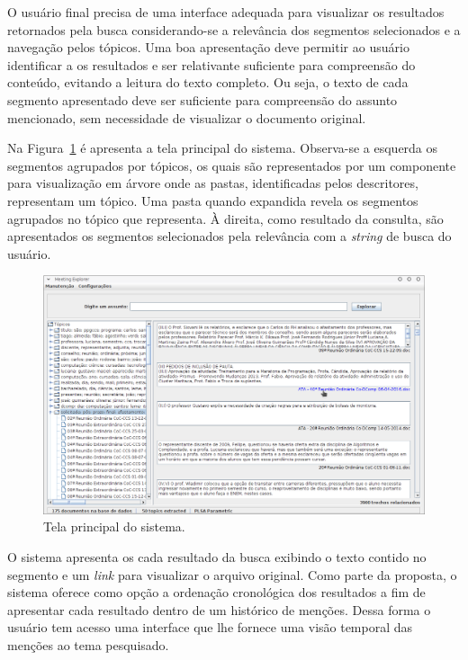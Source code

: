 O usuário final precisa de uma interface adequada para visualizar os resultados retornados pela busca considerando-se a relevância dos segmentos selecionados e a navegação pelos tópicos. Uma boa apresentação deve permitir ao usuário identificar a os resultados e ser relativante suficiente para compreensão do conteúdo, evitando a leitura do texto completo. Ou seja, o texto de cada segmento apresentado deve ser suficiente para compreensão do assunto mencionado, sem necessidade de visualizar o documento original.



Na Figura~\ref{fig:tela-principal} é apresenta a tela principal do sistema. Observa-se a esquerda os segmentos agrupados por tópicos, os quais são representados por um componente para visualização em árvore onde as pastas, identificadas pelos descritores, representam um tópico. Uma pasta quando expandida revela os segmentos agrupados no tópico que representa. À direita, como resultado da consulta, são apresentados os segmentos selecionados pela relevância com a \textit{string} de busca do usuário. 

  \begin{figure}[!h]
	  \centering
	  \includegraphics[width=\textwidth]{conteudo/capitulos/figs/tela-principal-2-1.png}
	  \caption{Tela principal do sistema.}
	  \label{fig:tela-principal}
  \end{figure}





O sistema apresenta os cada resultado da busca exibindo o texto contido no segmento e um \textit{link} para visualizar o arquivo original.	
Como parte da proposta, o sistema oferece como opção a ordenação cronológica dos resultados a fim de apresentar cada resultado dentro de um histórico de menções. Dessa forma o usuário tem acesso uma interface que lhe fornece uma visão temporal das menções ao tema pesquisado.

